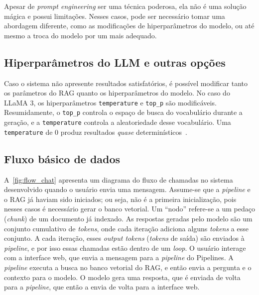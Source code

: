 \documentclass[journal]{IEEEtran}
\begin{document}
Apesar de \textit{prompt engineering} ser uma técnica poderosa, ela não é uma solução mágica e possui limitações.
Nesses casos, pode ser necessário tomar uma abordagem diferente, como as modificações de hiperparâmetros do modelo, ou até mesmo a troca do modelo por um mais adequado.

\subsection{Hiperparâmetros do LLM e outras opções}

\noindent%
Caso o sistema não apresente resultados satisfatórios, é possível modificar tanto os parâmetros do RAG quanto os hiperparâmetros do modelo.
No caso do LLaMA 3, os hiperparâmetros \texttt{temperature} e \texttt{top\_p} são modificáveis.
Resumidamente, o \texttt{top\_p} controla o espaço de busca do vocabulário durante a geração, e a \texttt{temperature} controla a aleatoriedade desse vocabulário.
Uma \texttt{temperature} de 0 produz resultados \textit{quase} determinísticos~\cite{llama3modelcard}.

\subsection{Fluxo básico de dados}

\noindent%
A~\cref{fig:flow_chat} apresenta um diagrama do fluxo de chamadas no sistema desenvolvido quando o usuário envia uma mensagem.
Assume-se que a \textit{pipeline} e o RAG já haviam sido iniciados; ou seja, não é a primeira inicialização, pois nesses casos é necessário gerar o banco vetorial.
Um ``nodo'' refere-se a um pedaço (\textit{chunk}) de um documento já indexado.
As respostas geradas pelo modelo são um conjunto cumulativo de \textit{tokens}, onde cada iteração adiciona alguns \textit{tokens} a esse conjunto.
A cada iteração, esses \textit{output tokens} (\textit{tokens} de saída) são enviados à \textit{pipeline}, e por isso essas chamadas estão dentro de um \textit{loop}.
O usuário interage com a interface web, que envia a mensagem para a \textit{pipeline} do Pipelines.
A \textit{pipeline} executa a busca no banco vetorial do RAG, e então envia a pergunta e o contexto para o modelo.
O modelo gera uma resposta, que é enviada de volta para a \textit{pipeline}, que então a envia de volta para a interface web.
\end{document}

